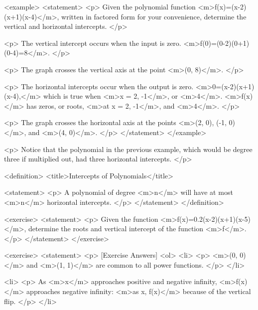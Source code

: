         <example>
            <statement>
                <p>
                    Given the polynomial function <m>f(x)=(x-2)(x+1)(x-4)</m>, written in factored form for your convenience, determine the vertical and horizontal intercepts.
                </p>

                <p>
                    The vertical intercept occurs when the input is zero.
                    <m>f(0)=(0-2)(0+1)(0-4)=8</m>.
                </p>

                <p>
                    The graph crosses the vertical axis at the point <m>(0, 8)</m>.
                </p>

                <p>
                    The horizontal intercepts occur when the output is zero.
                    <m>0=(x-2)(x+1)(x-4),</m> which is true when <m>x = 2, -1</m>, or <m>4</m>.
                    <m>f(x)</m> has zeros, or roots, <m>at x = 2, -1</m>, and <m>4</m>.
                </p>

                <p>
                    The graph crosses the horizontal axis at the points <m>(2, 0), (-1, 0)</m>, and <m>(4, 0)</m>.
                </p>
            </statement>
        </example>

        <p>
            Notice that the polynomial in the previous example, which would be degree three if multiplied out, had three horizontal intercepts.
        </p>

        <definition>
            <title>Intercepts of Polynomials</title>

            <statement>
                <p>
                    A polynomial of degree <m>n</m> will have at most <m>n</m> horizontal intercepts.
                </p>
            </statement>
        </definition>

        <exercise>
            <statement>
                <p>
                    Given the function <m>f(x)=0.2(x-2)(x+1)(x-5)</m>, determine the roots and vertical intercept of the function <m>f</m>.
                </p>
            </statement>
        </exercise>

        <exercise>
            <statement>
                <p>
                    [Exercise Answers]
                    <ol>
                        <li>
                            <p>
                                <m>(0, 0)</m> and <m>(1, 1)</m> are common to all power functions.
                            </p>
                        </li>

                        <li>
                            <p>
                                As <m>x</m> approaches positive and negative infinity, <m>f(x)</m> approaches negative infinity: <m>as x\rightarrow \pm\infty, f(x)\rightarrow\infty</m> because of the vertical flip.
                            </p>
                        </li>

